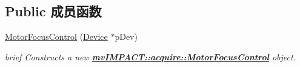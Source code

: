 \subsection*{Public 成员函数}
\begin{DoxyCompactItemize}
\item 
\hyperlink{classmv_i_m_p_a_c_t_1_1acquire_1_1_motor_focus_control_a0f790215b1eadcd259f7ada4257ab70c}{Motor\+Focus\+Control} (\hyperlink{classmv_i_m_p_a_c_t_1_1acquire_1_1_device}{Device} $\ast$p\+Dev)
\begin{DoxyCompactList}\small\item\em brief Constructs a new {\bfseries \hyperlink{classmv_i_m_p_a_c_t_1_1acquire_1_1_motor_focus_control}{mv\+I\+M\+P\+A\+C\+T\+::acquire\+::\+Motor\+Focus\+Control}} object. \end{DoxyCompactList}\end{DoxyCompactItemize}
